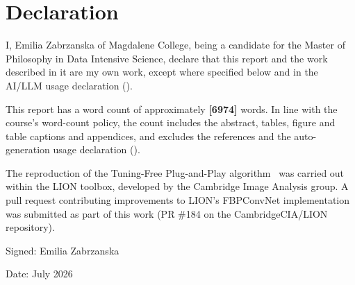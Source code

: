 \documentclass[11pt,a4paper,twoside]{report}
\newcommand{\college}{Magdalene College}
\newcommand{\coursethe}{Master of Philosophy in Data Intensive Science}
\begin{document}
\chapter*{Declaration}
\thispagestyle{empty}

I, Emilia Zabrzanska of \college, being a candidate for the \coursethe, declare that this report and the work described in it are my own work, except where specified below and in the AI/LLM usage declaration ().

This report has a word count of approximately \textbf{[6974]} words. In line with the course's word-count policy, the count includes the abstract, tables, figure and table captions and appendices, and excludes the references and the auto-generation usage declaration ().

The reproduction of the Tuning-Free Plug-and-Play algorithm~\citep{Wei2022TFPnP} was carried out within the LION toolbox, developed by the Cambridge Image Analysis group. A pull request contributing improvements to LION's FBPConvNet implementation was submitted as part of this work (PR \#184 on the CambridgeCIA/LION repository).

\vspace{1cm}

\noindent Signed: Emilia Zabrzanska

\noindent Date: July 2026
\end{document}
